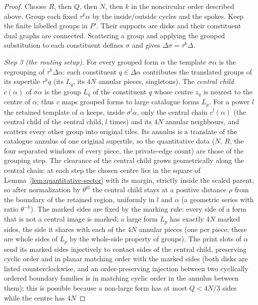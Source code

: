 \begin{proof}
Choose $R$, then $Q$, then $N$, then $k$ in the noncircular order described
above.  Group each fixed $\tau^k\alpha$ by the inside/outside cycles and
the spokes.  Keep the finite labelled groups in $P'$.  Their supports are
disks and their constituent dual graphs are connected.  Scattering a group
and applying the grouped substitution to each constituent defines $\sigma$
and gives $\Delta\sigma=\tau^k\Delta$.

\emph{Step 3 (the routing setup).}  For every grouped form $\alpha$ the
template $\sigma\alpha$ is the regrouping of $\tau^k\Delta\alpha$: each
constituent $q\in\Delta\alpha$ contributes the translated groups of its
supertile $\tau^kq$ (its $L_q$, its $4N$ annular pieces, singletons).  The
\emph{central child} $c(\alpha)$ of $\sigma\alpha$ is the group $L_q$ of the
constituent $q$ whose centre $z_q$ is nearest to the centre of $\alpha$; thus
$c$ maps grouped forms to large catalogue forms $L_p$.  For a power $l$ the
retained template of $\alpha$ keeps, inside $\sigma^l\alpha$, only the
central chain $c^l(\alpha)$ (the central child of the central child, $l$
times) and its $4N$ annular neighbours, and scatters every other group into
original tiles.  Its annulus is a translate of the catalogue annulus of one
original supertile, so the quantitative data ($N$, $R$, the four separated
windows of every piece, the private-edge count) are those of the grouping
step.  The clearance of the central child grows geometrically along the
central chain: at each step the chosen centre lies in the square of
Lemma~\ref{lem:quantitative-sector} with its margin, strictly inside the
scaled parent, so after normalization by $\theta^{kl}$ the central child
stays at a positive distance $\rho$ from the boundary of the retained region,
uniformly in $l$ and $\alpha$ (a geometric series with ratio $\theta^{-k}$).
The marked sides are fixed by the marking rule: every side of a form that is
not a central image is marked; a large form $L_p$ has exactly $4N$ marked
sides, the side it shares with each of the $4N$ annular pieces (one per
piece; these are whole sides of $L_p$ by the whole-side property of groups).
The print slots of $\alpha$ send its marked sides injectively to contact
sides of the central child, preserving cyclic order and in planar matching
order with the marked sides (both disks are listed counterclockwise, and an
order-preserving injection between two cyclically ordered boundary families
is in matching cyclic order in the annulus between them); this is possible
because a non-large form has at most $Q<4N/3$ sides while the centre has $4N$

\end{proof}
